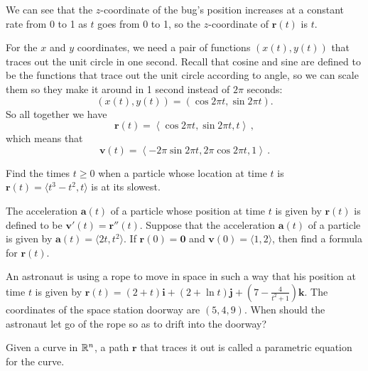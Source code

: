 \documentclass{watsonbook}
\begin{document}
\begin{solution}
  We can see that the $z$-coordinate of the bug's position increases
  at a constant rate from 0 to 1 as $t$ goes from 0 to 1, so the
  $z$-coordinate of $\mathbf{r}(t)$ is $t$.

  For the $x$ and $y$ coordinates, we need a pair of functions
  $(x(t),y(t))$ that traces out the unit circle in one second. Recall
  that cosine and sine are defined to be the functions that trace out
  the unit circle according to angle, so we can scale them so they
  make it around in 1 second instead of $2\pi$ seconds:
  \[
    (x(t),y(t)) = \left( \cos 2\pi t, \sin 2\pi t
    \right). 
  \]
  So all together we have
  \[
    \boxed{\mathbf{r}(t) =  \left\langle \cos 2\pi t, \sin 2\pi t
        , t \right\rangle}\,, 
  \]
  which means that
  \[
    \boxed{\mathbf{v}(t) = \left\langle -2\pi \sin 2\pi t, 2\pi\cos 2\pi t
        , 1 \right\rangle}\,.
  \]
\end{solution}

\begin{exercise}{}{}
  Find the times $t \geq 0$ when a particle whose location at time $t$
  is $\mathbf{r}(t) = \langle t^3 - t^2, t\rangle$ is at its slowest.
\end{exercise}

\begin{exercise}{}{}
  The acceleration $\mathbf{a}(t)$ of a particle whose position at
  time $t$ is given by $\mathbf{r}(t)$ is defined to be
  $\mathbf{v}'(t) = \mathbf{r}''(t)$.  Suppose that the acceleration
  $\mathbf{a}(t)$ of a particle is given by
  $\mathbf{a}(t) = \langle 2t, t^2 \rangle$. If
  $\mathbf{r}(0) = \mathbf{0}$ and
  $\mathbf{v}(0) = \langle 1, 2 \rangle$, then find a formula for
  $\mathbf{r}(t)$.
\end{exercise}

\begin{exercise}{}{}
  An astronaut is using a rope to move in space in such a way that his
  position at time $t$ is given by 
  $\mathbf{r}(t) = (2+t) \mathbf{i} + (2+\ln t) \mathbf{j} + \left( 7
    - \frac{4}{t^2+1}\right) \mathbf{k}$. The coordinates of the space
  station doorway are $(5,4,9)$. When should the astronaut let go of the
  rope so as to drift into the doorway? 
\end{exercise}

Given a curve in $\mathbb{R}^n$, a path $\mathbf{r}$ that traces it out is
called a parametric equation for the curve. \enlargethispage{1cm} 
\end{document}
